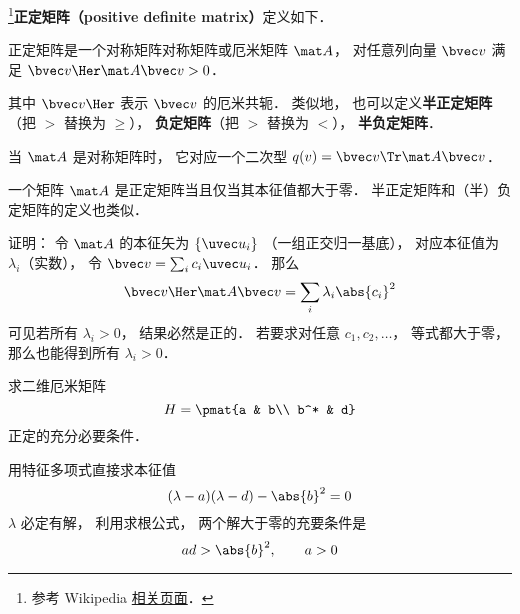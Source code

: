 
\begin{issues}
\issueTODO
\end{issues}


\footnote{参考 Wikipedia \href{https://en.wikipedia.org/wiki/Definite_matrix}{相关页面}．}\textbf{正定矩阵（positive definite matrix）}定义如下．
\begin{definition}{}
正定矩阵是一个对称矩阵对称矩阵或厄米矩阵 $\mat A$， 对任意列向量 $\bvec v$ 满足 $\bvec v\Her \mat A \bvec v > 0$．
\end{definition}
其中 $\bvec v\Her$ 表示 $\bvec v$ 的厄米共轭． 类似地， 也可以定义\textbf{半正定矩阵}（把 $>$ 替换为 $\geqslant$）， \textbf{负定矩阵}（把 $>$ 替换为 $<$）， \textbf{半负定矩阵}．

当 $\mat A$ 是对称矩阵时， 它对应一个二次型 $q(v) = \bvec v\Tr \mat A \bvec v$．

\begin{theorem}{}
一个矩阵 $\mat A$ 是正定矩阵当且仅当其本征值都大于零． 半正定矩阵和（半）负定矩阵的定义也类似．
\end{theorem}

证明： 令 $\mat A$ 的本征矢为 $\{\uvec u_i\}$ （一组正交归一基底）， 对应本征值为 $\lambda_i$（实数）， 令 $\bvec v = \sum_i c_i \uvec u_i$． 那么
\begin{equation}
\bvec v\Her \mat A \bvec v = \sum_i \lambda_i \abs{c_i}^2
\end{equation}
可见若所有 $\lambda_i > 0$， 结果必然是正的． 若要求对任意 $c_1,c_2,\dots$， 等式都大于零， 那么也能得到所有 $\lambda_i > 0$．

\begin{example}{}
求二维厄米矩阵
\begin{equation}
H = \pmat{a & b\\ b^* & d}
\end{equation}
正定的充分必要条件．

用特征多项式直接求本征值
\begin{equation}
(\lambda - a)(\lambda - d) - \abs{b}^2 = 0
\end{equation}
$\lambda$ 必定有解， 利用求根公式， 两个解大于零的充要条件是
\begin{equation}
ad > \abs{b}^2, \qquad
a > 0
\end{equation}
\end{example}
